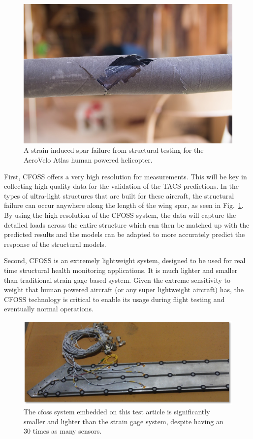 \documentclass[]{aiaa-tc}
\begin{document}
        \begin{figure}[!hbt]
            \centering
            \includegraphics[width=.5\textwidth]{images/spar_failure}
            \caption{A strain induced spar failure from structural testing for the AeroVelo Atlas human powered helicopter.}
            \label{fig:spar-failure}
        \end{figure}

        First, CFOSS offers a very high resolution for measurements. This will be key in collecting high quality data for the validation 
        of the TACS predictions. In the types of ultra-light structures that are built for these aircraft, the structural failure can 
        occur anywhere along the length of the wing spar, as seen in Fig.~\ref{fig:spar-failure}. By using the 
        high resolution of the CFOSS system, the data will capture the detailed loads across the entire structure 
        which can then be matched up with the predicted results and the models can be adapted to more accurately 
        predict the response of the structural models.

        Second, CFOSS is an extremely lightweight system, designed to be used for real time structural health monitoring applications.
        It is much lighter and smaller than traditional strain gage based system. Given the extreme sensitivity to weight
        that human powered aircraft (or any super lightweight aircraft) has, the CFOSS technology is critical to enable its usage during 
        flight testing and eventually normal operations. 


        \begin{figure}[!hbt]
            \centering
            \includegraphics[width=.9\textwidth]{images/cfoss_vs_straingauge}
            \caption{The cfoss system embedded on this test article is significantly smaller and lighter than the strain gage system, 
            despite having an 30 times as many sensors. }
            \label{fig:cfoss-vs-straingauge}
        \end{figure}
\end{document}
